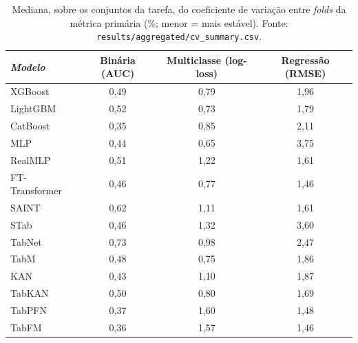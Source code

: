 \begin{table}[htbp]
\centering
\small
\caption[Variabilidade entre \emph{folds}]{Mediana, sobre os conjuntos da tarefa, do coeficiente de variação entre \emph{folds} da métrica primária (\%; menor = mais estável). Fonte: \texttt{results/\allowbreak aggregated/\allowbreak cv\_\allowbreak summary.\allowbreak csv}.}
\label{tab:app-foldvar}
\begin{tabular}{lccc}
\toprule
\emph{Modelo} & Binária (AUC) & Multiclasse (log-loss) & Regressão (RMSE) \\
\midrule
XGBoost & 0{,}49 & 0{,}79 & 1{,}96 \\
LightGBM & 0{,}52 & 0{,}73 & 1{,}79 \\
CatBoost & 0{,}35 & 0{,}85 & 2{,}11 \\
MLP & 0{,}44 & 0{,}65 & 3{,}75 \\
RealMLP & 0{,}51 & 1{,}22 & 1{,}61 \\
FT-Transformer & 0{,}46 & 0{,}77 & 1{,}46 \\
SAINT & 0{,}62 & 1{,}11 & 1{,}61 \\
STab & 0{,}46 & 1{,}32 & 3{,}60 \\
TabNet & 0{,}73 & 0{,}98 & 2{,}47 \\
TabM & 0{,}48 & 0{,}75 & 1{,}86 \\
KAN & 0{,}43 & 1{,}10 & 1{,}87 \\
TabKAN & 0{,}50 & 0{,}80 & 1{,}69 \\
TabPFN & 0{,}37 & 1{,}60 & 1{,}48 \\
TabFM & 0{,}36 & 1{,}57 & 1{,}46 \\
\bottomrule
\end{tabular}
\end{table}
